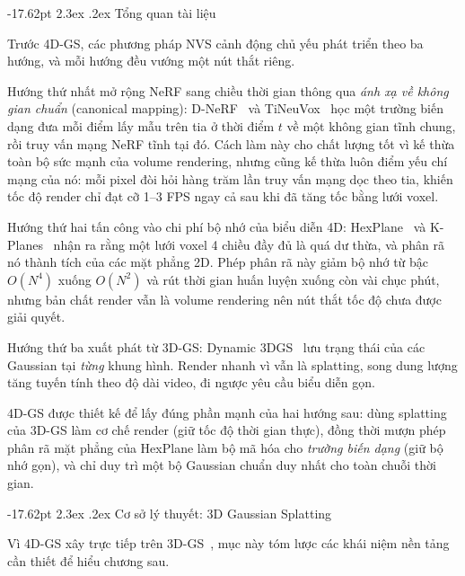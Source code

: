 \documentclass[a4paper]{report}
\makeatletter
\renewcommand\section{\@startsection{section}{1}{\z@}%
    {-17.62pt \@plus -5.89pt \@minus -1.18pt}%
    {2.3ex \@plus .2ex}%
    {\normalfont\fontsize{14.95pt}{16.31pt}\selectfont\bfseries}}
\makeatother
\begin{document}
\section{Tổng quan tài liệu}

Trước 4D-GS, các phương pháp NVS cảnh động chủ yếu phát triển theo ba hướng,
và mỗi hướng đều vướng một nút thắt riêng.

Hướng thứ nhất mở rộng NeRF sang chiều thời gian thông qua \textit{ánh xạ về
không gian chuẩn} (canonical mapping): D-NeRF~\cite{pumarola2021dnerf} và
TiNeuVox~\cite{tineuvox} học một trường biến dạng đưa mỗi điểm lấy mẫu trên tia
ở thời điểm $t$ về một không gian tĩnh chung, rồi truy vấn mạng NeRF tĩnh tại đó.
Cách làm này cho chất lượng tốt vì kế thừa toàn bộ sức mạnh của volume rendering,
nhưng cũng kế thừa luôn điểm yếu chí mạng của nó: mỗi pixel đòi hỏi hàng trăm
lần truy vấn mạng dọc theo tia, khiến tốc độ render chỉ đạt cỡ 1--3 FPS ngay cả
sau khi đã tăng tốc bằng lưới voxel.

Hướng thứ hai tấn công vào chi phí bộ nhớ của biểu diễn 4D:
HexPlane~\cite{hexplane} và K-Planes~\cite{kplanes} nhận ra rằng một lưới voxel
4 chiều đầy đủ là quá dư thừa, và phân rã nó thành tích của các mặt phẳng 2D.
Phép phân rã này giảm bộ nhớ từ bậc $O(N^4)$ xuống $O(N^2)$ và rút thời gian
huấn luyện xuống còn vài chục phút, nhưng bản chất render vẫn là volume
rendering nên nút thắt tốc độ chưa được giải quyết.

Hướng thứ ba xuất phát từ 3D-GS: Dynamic 3DGS~\cite{dynamic3dgs} lưu trạng thái của các Gaussian tại
\textit{từng} khung hình. Render nhanh vì vẫn là splatting, song dung lượng tăng
tuyến tính theo độ dài video, đi ngược yêu cầu biểu diễn gọn.

4D-GS được thiết kế để lấy đúng phần mạnh của hai hướng sau: dùng splatting của
3D-GS làm cơ chế render (giữ tốc độ thời gian thực), đồng thời mượn phép phân rã
mặt phẳng của HexPlane làm bộ mã hóa cho \textit{trường biến dạng} (giữ bộ nhớ
gọn), và chỉ duy trì một bộ Gaussian chuẩn duy nhất cho toàn chuỗi thời gian.

\section{Cơ sở lý thuyết: 3D Gaussian Splatting}
\label{sec:3dgs}

Vì 4D-GS xây trực tiếp trên 3D-GS~\cite{3dgs}, mục này tóm lược các khái niệm
nền tảng cần thiết để hiểu chương sau.
\end{document}
